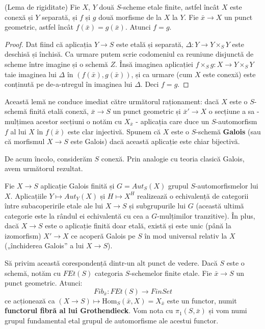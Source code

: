 \documentclass[13pt,openany]{book}
\begin{document}
\begin{lema}
(Lema de rigiditate) Fie $X$, $Y$ două $S$-scheme etale finite, astfel încât $X$ este conexă și $Y$ separată, și $f$ și $g$ două morfisme de la $X$ la $Y$. Fie $\bar{x} \rightarrow X$ un punct geometric, astfel încât $f(\bar{x})=g(\bar{x})$. Atunci $f=g$.
\end{lema}

\begin{proof}
Dat fiind că aplicația $Y \rightarrow S$ este etală și separată, $\Delta : Y \rightarrow Y \times_S Y$ este deschisă și închisă. Ca urmare putem scrie codomeniul ca reuniune disjunctă de scheme între imagine și o schemă $Z$. Însă imaginea aplicației $f \times_S g: X \rightarrow Y \times_S Y$ taie imaginea lui $\Delta$ în $(f(\bar{x}),g(\bar{x}))$, și ca urmare (cum $X$ este conexă) este conținută pe de-a-ntregul în imaginea lui $\Delta$. Deci $f=g$.
\end{proof}

Această lemă ne conduce imediat către următorul raționament: dacă $X$ este o $S$-schemă finită etală conexă, $\bar{x} \rightarrow S$ un punct geometric și $\bar{x}'\rightarrow X$ o secțiune a sa - mulțimea acestor secțiuni o notăm cu $X_{\bar{x}}$ - aplicația care duce un $S$-automorfism $f$ al lui $X$ în $f(\bar{x})$ este clar injectivă. Spunem că $X$ este o $S$-schemă {\bf Galois} (sau că morfismul $X \rightarrow S$ este Galois) dacă această aplicație este chiar bijectivă.

De acum încolo, considerăm $S$ conexă. Prin analogie cu teoria clasică Galois, avem următorul rezultat.

\begin{prop}
Fie $X \rightarrow S$ aplicație Galois finită și $G=Aut_S(X)$ grupul $S$-automorfismelor lui $X$. Aplicațiile $Y \mapsto Aut_Y(X)$ și $H \mapsto X^H$ realizează o echivalență de categorii între subacoperirile etale ale lui $X \rightarrow S$ și subgrupurile lui $G$ (această ultimă categorie este la rândul ei echivalentă cu cea a $G$-mulțimilor tranzitive). În plus, dacă $X \rightarrow S$ este o aplicație finită doar etală, există și este unic (până la izomorfism) $X' \rightarrow X$ ce acoperă Galois pe $S$ în mod universal relativ la $X$ („închiderea Galois” a lui $X \rightarrow S$).
\end{prop}

Să privim această corespondență dintr-un alt punct de vedere. Dacă $S$ este o schemă, notăm cu $FEt(S)$ categoria $S$-schemelor finite etale. Fie $\bar{x} \rightarrow S$ un punct geometric. Atunci:
$$Fib_{\bar{x}} : FEt(S) \rightarrow FinSet$$
ce acționează ca $(X \rightarrow S) \mapsto \text{Hom}_S(\bar{x},X)=X_{\bar{x}}$ este un functor, numit {\bf functorul fibră al lui Grothendieck}. Vom nota cu $\pi_1(S,\bar{x})$ și vom numi grupul fundamental etal grupul de automorfisme ale acestui functor.
\end{document}
